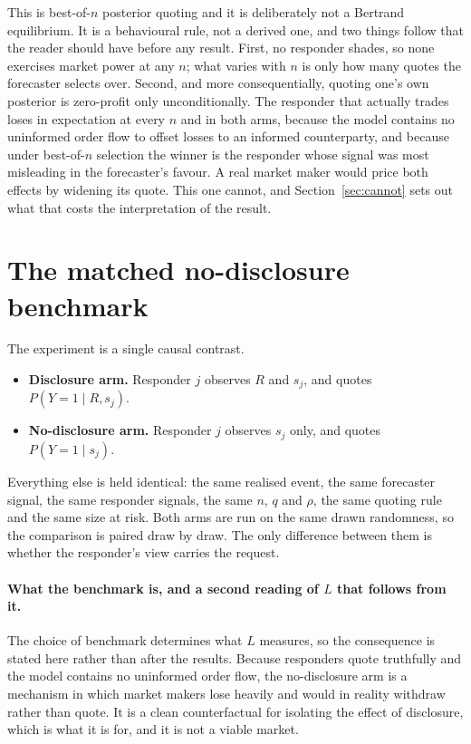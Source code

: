 This is best-of-$n$ posterior quoting and it is deliberately not a Bertrand equilibrium. It
is a behavioural rule, not a derived one, and two things follow that the reader should have
before any result. First, no responder shades, so none exercises market power at any $n$;
what varies with $n$ is only how many quotes the forecaster selects over. Second, and more
consequentially, quoting one's own posterior is zero-profit only unconditionally. The
responder that actually trades loses in expectation at every $n$ and in both arms, because
the model contains no uninformed order flow to offset losses to an informed counterparty,
and because under best-of-$n$ selection the winner is the responder whose signal was most
misleading in the forecaster's favour. A real market maker would price both effects by
widening its quote. This one cannot, and Section~\ref{sec:cannot} sets out what that costs
the interpretation of the result.

\section{The matched no-disclosure benchmark}
\label{sec:benchmark}

The experiment is a single causal contrast.

\begin{itemize}
  \item \textbf{Disclosure arm.} Responder $j$ observes $R$ and $s_j$, and quotes
    $P(Y=1 \mid R, s_j)$.
  \item \textbf{No-disclosure arm.} Responder $j$ observes $s_j$ only, and quotes
    $P(Y=1 \mid s_j)$.
\end{itemize}

Everything else is held identical: the same realised event, the same forecaster signal, the
same responder signals, the same $n$, $q$ and $\rho$, the same quoting rule and the same size
at risk. Both arms are run on the same drawn randomness, so the comparison is paired draw by
draw. The only difference between them is whether the responder's view carries the request.

\paragraph{What the benchmark is, and a second reading of $L$ that follows from it.} The
choice of benchmark determines what $L$ measures, so the consequence is stated here rather
than after the results. Because responders quote truthfully and the model contains no
uninformed order flow, the no-disclosure arm is a mechanism in which market makers lose
heavily and would in reality withdraw rather than quote. It is a clean counterfactual for
isolating the effect of disclosure, which is what it is for, and it is not a viable market.

